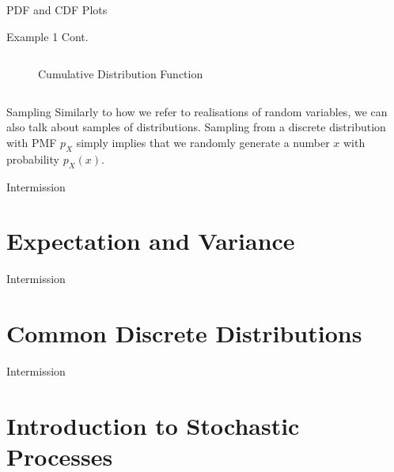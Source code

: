 \documentclass[10pt]{beamer}
\begin{document}
\begin{frame}[fragile]{PDF and CDF Plots}
\begin{exampleblock}{Example 1 Cont.}
\begin{columns}
\begin{column}{0.5\textwidth}
\begin{figure}
    \caption{Cumulative Distribution Function}
\end{figure}
\end{column}
\end{columns}
\end{exampleblock}
\end{frame}

\begin{frame}[fragile]{Sampling}
Similarly to how we refer to realisations of random variables, we can also talk about samples of distributions. Sampling from a discrete distribution with PMF \(p_X\) simply implies that we randomly generate a number \(x\) with probability \(p_X\left(x\right)\).


\end{frame}

\begin{frame}[standout]
Intermission
\end{frame}

\section{Expectation and Variance}

\begin{frame}[standout]
Intermission
\end{frame}

\section{Common Discrete Distributions}

\begin{frame}[standout]
Intermission
\end{frame}

\section{Introduction to Stochastic Processes}
\end{document}
